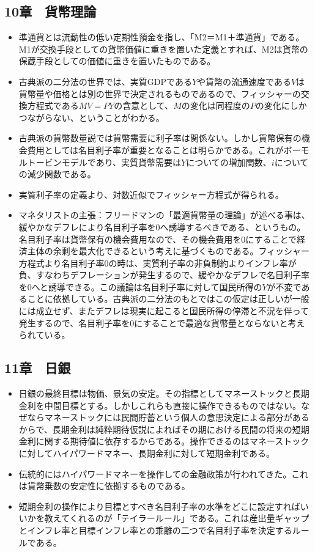 \documentclass{jsarticle}
\begin{document}
\subsection{10章　貨幣理論}
\begin{itemize}
	\item 準通貨とは流動性の低い定期性預金を指し、「M2＝M1＋準通貨」である。M1が交換手段としての貨幣価値に重きを置いた定義とすれば、M2は貨幣の保蔵手段としての価値に重きを置いたものである。
	\item 古典派の二分法の世界では、実質GDPである$Y$や貨幣の流通速度である$V$は貨幣量や価格とは別の世界で決定されるものであるので、フィッシャーの交換方程式である$MV = PY$の含意として、$M$の変化は同程度の$P$の変化にしかつながらない、ということがわかる。
	\item 古典派の貨幣数量説では貨幣需要に利子率は関係ない。しかし貨幣保有の機会費用としては名目利子率が重要となることは明らかである。これがボーモルトービンモデルであり、実質貨幣需要は$Y$についての増加関数、$i$についての減少関数である。
	\item 実質利子率の定義より、対数近似でフィッシャー方程式が得られる。
	\item マネタリストの主張：フリードマンの「最適貨幣量の理論」が述べる事は、緩やかなデフレにより名目利子率を0へ誘導するべきである、というもの。名目利子率は貨幣保有の機会費用なので、その機会費用を0にすることで経済主体の余剰を最大化できるという考えに基づくものである。フィッシャー方程式より名目利子率0の時は、実質利子率の非負制約よりインフレ率が負、すなわちデフレーションが発生するので、緩やかなデフレで名目利子率を0へと誘導できる。この議論は名目利子率に対して国民所得の$Y$が不変であることに依拠している。古典派の二分法のもとではこの仮定は正しいが一般には成立せず、またデフレは現実に起こると国民所得の停滞と不況を伴って発生するので、名目利子率を0にすることで最適な貨幣量とならないと考えられている。
\end{itemize}

\subsection{11章　日銀}
\begin{itemize}
	\item 日銀の最終目標は物価、景気の安定。その指標としてマネーストックと長期金利を中間目標とする。しかしこれらも直接に操作できるものではない。なぜならマネーストックには民間貯蓄という個人の意思決定による部分があるからで、長期金利は純粋期待仮説によればその期における民間の将来の短期金利に関する期待値に依存するからである。操作できるのはマネーストックに対してハイパワードマネー、長期金利に対して短期金利である。
	\item 伝統的にはハイパワードマネーを操作しての金融政策が行われてきた。これは貨幣乗数の安定性に依拠するものである。
	\item 短期金利の操作により目標とすべき名目利子率の水準をどこに設定すればいいかを教えてくれるのが「テイラールール」である。これは産出量ギャップとインフレ率と目標インフレ率との乖離の二つで名目利子率を決定するルールである。
\end{itemize}
\end{document}
